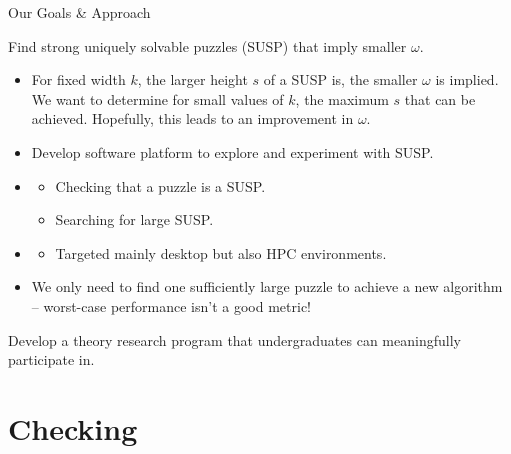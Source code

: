 \documentclass[t,10pt,
mathserif,xcolor=dvipsnames]{beamer}
\begin{document}
\begin{myframe}{Our Goals \& Approach}

   Find strong uniquely solvable puzzles (SUSP) that imply smaller $\omega$.

  \medskip

  \pause
  
  \begin{itemize}
  \item For fixed width $k$, the larger height $s$ of a SUSP is, the
    smaller $\omega$ is implied. We want to determine for small values
    of $k$, the maximum $s$ that can be achieved.  Hopefully, this
    leads to an improvement in $\omega$.
  \item Develop software platform to explore and experiment with SUSP.
  \item {}
    \begin{itemize}
    \item Checking that a puzzle is a SUSP.
    \item Searching for large SUSP.
    \end{itemize}
  \item {}
    \begin{itemize}
    \item Targeted mainly desktop but also HPC environments.
    \end{itemize}
  \item We only need to find one sufficiently large puzzle to achieve
    a new algorithm -- worst-case performance isn't a good metric!
  \end{itemize}

  \medskip
  \pause
  
   Develop a theory research program that
  undergraduates can meaningfully participate in.
  
  
  
\end{myframe}

\section{Checking}


\newcommand\coNP{\ensuremath{\mathrm{coNP}}}
\end{document}
